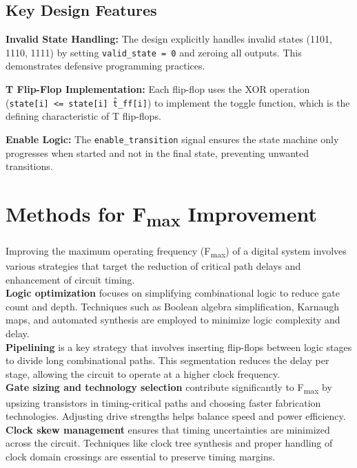 \documentclass[10pt,a4paper]{article}
\begin{document}
\subsection*{Key Design Features}

\textbf{Invalid State Handling:}
The design explicitly handles invalid states (1101, 1110, 1111) by setting \texttt{valid\_state = 0} and zeroing all outputs. This demonstrates defensive programming practices.

\noindent \textbf{T Flip-Flop Implementation:}
Each flip-flop uses the XOR operation (\texttt{state[i] <= state[i] \^ t\_ff[i]}) to implement the toggle function, which is the defining characteristic of T flip-flops.

\noindent \textbf{Enable Logic:}
The \texttt{enable\_transition} signal ensures the state machine only progresses when started and not in the final state, preventing unwanted transitions.

\section*{Methods for F\textsubscript{max} Improvement}

\noindent Improving the maximum operating frequency (F\textsubscript{max}) of a digital system involves various strategies that target the reduction of critical path delays and enhancement of circuit timing.\\

\noindent \textbf{Logic optimization} focuses on simplifying combinational logic to reduce gate count and depth. Techniques such as Boolean algebra simplification, Karnaugh maps, and automated synthesis are employed to minimize logic complexity and delay.\\

\noindent \textbf{Pipelining} is a key strategy that involves inserting flip-flops between logic stages to divide long combinational paths. This segmentation reduces the delay per stage, allowing the circuit to operate at a higher clock frequency.\\

\noindent \textbf{Gate sizing and technology selection} contribute significantly to F\textsubscript{max} by upsizing transistors in timing-critical paths and choosing faster fabrication technologies. Adjusting drive strengths helps balance speed and power efficiency.\\


\noindent \textbf{Clock skew management} ensures that timing uncertainties are minimized across the circuit. Techniques like clock tree synthesis and proper handling of clock domain crossings are essential to preserve timing margins.\\
\end{document}
